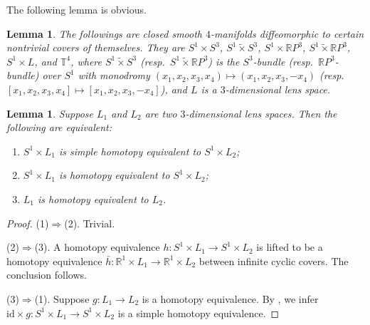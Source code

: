 \documentclass[12pt]{amsart}
\theoremstyle{plain}
\newtheorem{lemma}[theorem]{Lemma}
\theoremstyle{definition}
\theoremstyle{question}
\theoremstyle{remark}
\theoremstyle{assumption}
\numberwithin{equation}{section}
\theoremstyle{bigthm}
\begin{document}
The following lemma is obvious.
\begin{lemma}\label{lem_4-manifold}
The followings are closed smooth $4$-manifolds diffeomorphic to certain nontrivial covers of themselves. They are $S^{1} \times S^{3}$, $S^{1} \tilde{\times} S^{3}$, $S^{1} \times \mathbb{R}P^{3}$, $S^{1} \tilde{\times} \mathbb{R}P^{3}$, $S^{1} \times L$, and $\mathbb{T}^{4}$, where $S^{1} \tilde{\times} S^{3}$ (resp.~$S^{1} \tilde{\times} \mathbb{R}P^{3}$) is the $S^{3}$-bundle (resp.~$\mathbb{R}P^{3}$-bundle) over $S^{1
}$ with monodromy $(x_{1}, x_{2}, x_{3}, x_{4}) \mapsto (x_{1}, x_{2}, x_{3}, -x_{4})$ (resp.~$[x_{1}, x_{2}, x_{3}, x_{4}] \mapsto [x_{1}, x_{2}, x_{3}, -x_{4}]$), and $L$ is a $3$-dimensional lens space.
\end{lemma}

\begin{lemma}\label{lem_S1_lens}
Suppose $L_{1}$ and $L_{2}$ are two $3$-dimensional lens spaces. Then the following are equivalent:
\begin{enumerate}
\item $S^{1} \times L_{1}$ is simple homotopy equivalent to $S^{1} \times L_{2}$;

\item $S^{1} \times L_{1}$ is homotopy equivalent to $S^{1} \times L_{2}$;

\item $L_{1}$ is homotopy equivalent to $L_{2}$.
\end{enumerate}
\end{lemma}
\begin{proof}
(1)$\Rightarrow$(2). Trivial.

(2)$\Rightarrow$(3). A homotopy equivalence $h \colon  S^{1} \times L_{1} \rightarrow S^{1} \times L_{2}$ is lifted to be a homotopy equivalence $\bar{h} \colon  \mathbb{R}^{1} \times L_{1} \rightarrow \mathbb{R}^{1} \times L_{2}$ between infinite cyclic covers. The conclusion follows.

(3)$\Rightarrow$(1). Suppose $g \colon  L_{1} \rightarrow L_{2}$ is a homotopy equivalence. By \cite[(23.2)]{Cohen}, we infer $\mathrm{id} \times g \colon  S^{1} \times L_{1} \rightarrow S^{1} \times L_{2}$ is a simple homotopy equivalence.
\end{proof}
\end{document}

